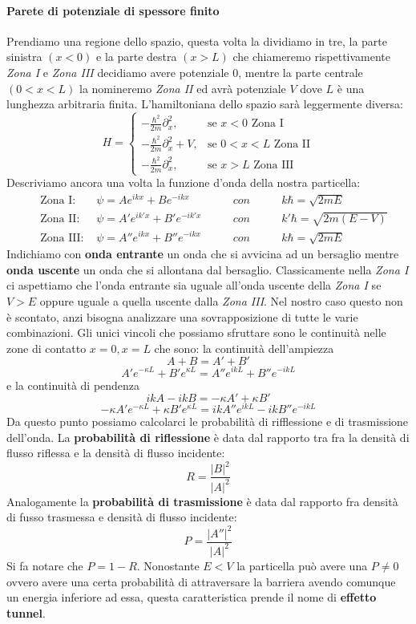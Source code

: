 \paragraph{Parete di potenziale di spessore finito}
Prendiamo una regione dello spazio, questa volta la dividiamo in tre, la parte sinistra $(x < 0)$ e la parte destra $(x > L)$ che chiameremo rispettivamente \textit{Zona I} e \textit{Zona III} decidiamo avere potenziale $0$, mentre la parte centrale $(0 < x < L)$ la nomineremo \textit{Zona II} ed avrà potenziale $V$ dove $L$ è una lunghezza arbitraria finita. L'hamiltoniana dello spazio sarà leggermente diversa:
$$H=\begin{cases} - \frac{\hbar^2}{2m} \partial_x^2, & \mbox{se } x<0 \mbox{ Zona I} \\
 - \frac{\hbar^2}{2m} \partial_x^2 + V, & \mbox{se } 0<x<L \mbox{ Zona II} \\
 - \frac{\hbar^2}{2m} \partial_x^2, & \mbox{se } x>L \mbox{ Zona III}
\end{cases}$$
Descriviamo ancora una volta la funzione d'onda della nostra particella:
\begin{equation}
\begin{aligned}
  \quad \mbox{Zona I: }   &\psi = Ae^{ikx} + Be^{-ikx} \qquad     & con \qquad & k\hbar = \sqrt{2mE}\\
  \quad \mbox{Zona II: }  &\psi = A'e^{ik'x} + B'e^{-ik'x} \qquad & con \qquad & k'\hbar = \sqrt{2m(E-V)}\\
  \quad \mbox{Zona III: } &\psi = A''e^{ikx} + B''e^{-ikx} \qquad & con \qquad & k\hbar = \sqrt{2mE}
\end{aligned}
\end{equation}
Indichiamo con \textbf{onda entrante} un onda che si avvicina ad un bersaglio mentre \textbf{onda uscente} un onda che si allontana dal bersaglio. Classicamente nella \textit{Zona I} ci aspettiamo che l'onda entrante sia uguale all'onda uscente della \textit{Zona I} se $V > E$ oppure uguale a quella uscente dalla \textit{Zona III}. Nel nostro caso questo non è scontato, anzi bisogna analizzare una sovrapposizione di tutte le varie combinazioni. Gli unici vincoli che possiamo sfruttare sono le continuità nelle zone di contatto $ x = 0, x = L$ che sono: la continuità dell'ampiezza
$$A + B = A' + B'$$
$$A'e^{-\kappa L} + B'e^{\kappa L} = A''e^{ikL} + B''e^{-ikL}$$
e la continuità di pendenza
$$ikA - ikB = -\kappa A' + \kappa B'$$
$$-\kappa A'e^{-\kappa L} + \kappa B'e^{\kappa L} = ikA''e^{ikL} - ikB''e^{-ikL}$$
Da questo punto possiamo calcolarci le probabilità di rifflessione e di trasmissione dell'onda.
La \textbf{probabilità di riflessione} è data dal rapporto tra fra la densità di flusso riflessa e la densità di flusso incidente:
$$R = \frac{|B|^2}{|A|^2}$$
Analogamente la \textbf{probabilità di trasmissione} è data dal rapporto fra densità di fusso trasmessa e densità di flusso incidente:
$$P = \frac{|A''|^2}{|A|^2}$$
Si fa notare che $P = 1 - R$. Nonostante $E < V$ la particella può avere una $P \ne 0$ ovvero avere una certa probabilità di attraversare la barriera avendo comunque un energia inferiore ad essa, questa caratteristica prende il nome di \textbf{effetto tunnel}.

